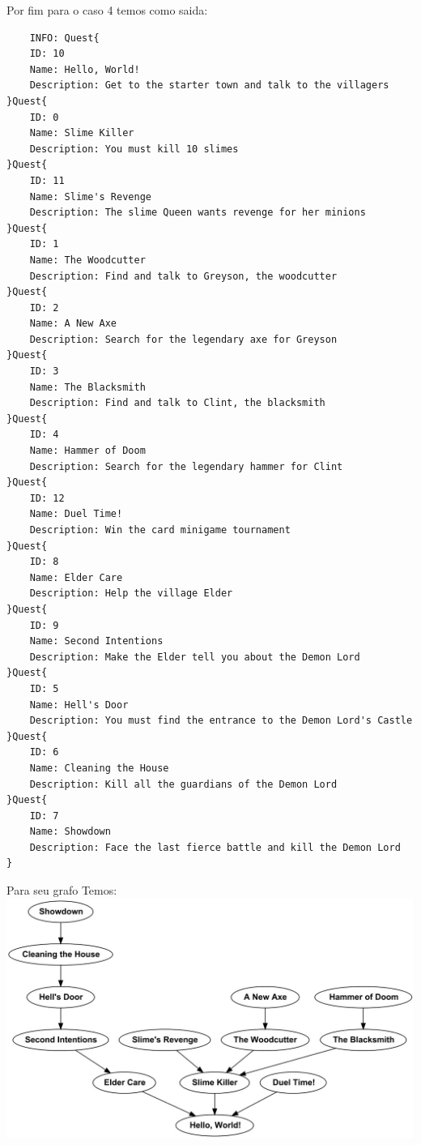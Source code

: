 \documentclass[a4paper, 12pt]{article}
\begin{document}
\newpage
Por fim para o caso 4 temos como saida:
\begin{verbatim}
    INFO: Quest{
	ID: 10
	Name: Hello, World!
	Description: Get to the starter town and talk to the villagers
}Quest{
	ID: 0
	Name: Slime Killer
	Description: You must kill 10 slimes
}Quest{
	ID: 11
	Name: Slime's Revenge
	Description: The slime Queen wants revenge for her minions
}Quest{
	ID: 1
	Name: The Woodcutter
	Description: Find and talk to Greyson, the woodcutter
}Quest{
	ID: 2
	Name: A New Axe
	Description: Search for the legendary axe for Greyson
}Quest{
	ID: 3
	Name: The Blacksmith
	Description: Find and talk to Clint, the blacksmith
}Quest{
	ID: 4
	Name: Hammer of Doom
	Description: Search for the legendary hammer for Clint
}Quest{
	ID: 12
	Name: Duel Time!
	Description: Win the card minigame tournament
}Quest{
	ID: 8
	Name: Elder Care
	Description: Help the village Elder
}Quest{
	ID: 9
	Name: Second Intentions
	Description: Make the Elder tell you about the Demon Lord
}Quest{
	ID: 5
	Name: Hell's Door
	Description: You must find the entrance to the Demon Lord's Castle
}Quest{
	ID: 6
	Name: Cleaning the House
	Description: Kill all the guardians of the Demon Lord
}Quest{
	ID: 7
	Name: Showdown
	Description: Face the last fierce battle and kill the Demon Lord
}
\end{verbatim}

Para seu grafo Temos:\\
\includegraphics[width=\textwidth]{Case4.jpeg}
\\
\\
\end{document}
